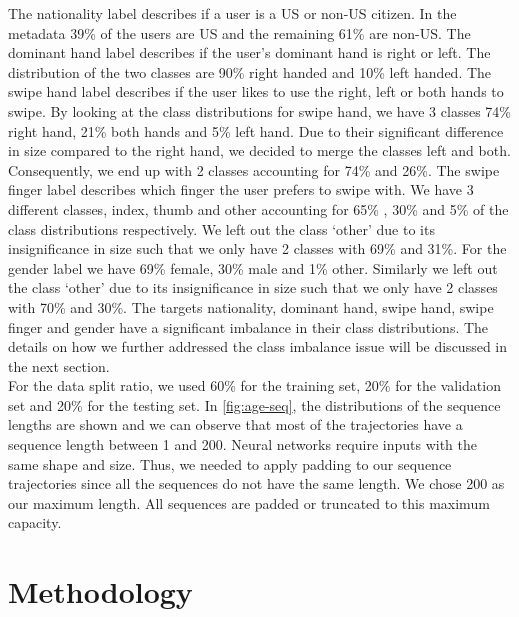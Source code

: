 \documentclass[11pt,oneside,a4paper,openright]{book}
\begin{document}
The nationality label describes if a user is a US or non-US citizen. In the metadata 39\% of the users are US  and the remaining 61\% are non-US. The dominant hand label describes if the user's dominant hand is right or left. The distribution of the two classes are  90\%  right handed and 10\% left handed. The swipe hand label describes if the user likes to use the right, left or both hands to swipe. By looking at the class distributions for swipe hand, we have  3 classes 74\% right hand, 21\% both hands and 5\% left hand. Due to their significant difference in size compared to the right hand, we decided to merge the classes left and both. Consequently, we end up with 2 classes accounting for 74\% and 26\%. The swipe finger label describes which finger the user prefers to swipe with. We have 3 different classes, index, thumb and other accounting for 65\% , 30\% and  5\% of the class distributions respectively.  We left out the class `other' due to its insignificance in size such that we only have 2 classes with 69\% and 31\%. For the gender label we have 69\% female, 30\% male and 1\% other. Similarly we left out the class `other' due to its insignificance in size such that we only have 2 classes with 70\% and 30\%. The targets nationality, dominant hand, swipe hand, swipe finger and gender have a significant imbalance in their class distributions. The details on how we further addressed the class imbalance issue will be discussed in the next section.\\

For the data split ratio, we used 60\% for the training set, 20\% for the validation set and 20\% for the testing set. In \autoref{fig:age-seq}, the distributions of the sequence lengths are shown and we can observe that most of the trajectories have a sequence length between 1 and 200. Neural networks require inputs with the same shape and size. Thus, we needed to apply padding to our sequence trajectories since all the sequences do not have the same length. We chose 200 as our maximum length. All sequences are padded or truncated to this maximum capacity. \newpage

\section{Methodology}

\end{document}
